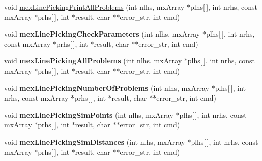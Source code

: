 \begin{DoxyCompactItemize}
\item 
void \hyperlink{group__matlabapi_gac6aa898603e0bfeff24f7eb02492641f}{mex\-Line\-Picking\-Print\-All\-Problems} (int nlhs, mx\-Array $\ast$plhs\mbox{[}$\,$\mbox{]}, int nrhs, const mx\-Array $\ast$prhs\mbox{[}$\,$\mbox{]}, int $\ast$result, char $\ast$$\ast$error\-\_\-str, int cmd)
\item 
\hypertarget{group__matlabapi_ga517627c493a1789dc8eeebdbeecd8a8d}{void {\bfseries mex\-Line\-Picking\-Check\-Parameters} (int nlhs, mx\-Array $\ast$plhs\mbox{[}$\,$\mbox{]}, int nrhs, const mx\-Array $\ast$prhs\mbox{[}$\,$\mbox{]}, int $\ast$result, char $\ast$$\ast$error\-\_\-str, int cmd)}\label{group__matlabapi_ga517627c493a1789dc8eeebdbeecd8a8d}

\item 
\hypertarget{group__matlabapi_ga9566788e47662982902e53d2b80e9cf4}{void {\bfseries mex\-Line\-Picking\-All\-Problems} (int nlhs, mx\-Array $\ast$plhs\mbox{[}$\,$\mbox{]}, int nrhs, const mx\-Array $\ast$prhs\mbox{[}$\,$\mbox{]}, int $\ast$result, char $\ast$$\ast$error\-\_\-str, int cmd)}\label{group__matlabapi_ga9566788e47662982902e53d2b80e9cf4}

\item 
\hypertarget{group__matlabapi_ga3049623df917340a56fa5df6278d06f6}{void {\bfseries mex\-Line\-Picking\-Number\-Of\-Problems} (int nlhs, mx\-Array $\ast$plhs\mbox{[}$\,$\mbox{]}, int nrhs, const mx\-Array $\ast$prhs\mbox{[}$\,$\mbox{]}, int $\ast$result, char $\ast$$\ast$error\-\_\-str, int cmd)}\label{group__matlabapi_ga3049623df917340a56fa5df6278d06f6}

\item 
\hypertarget{group__matlabapi_ga339fe5ed825457a410e325d1aac7c1e5}{void {\bfseries mex\-Line\-Picking\-Sim\-Points} (int nlhs, mx\-Array $\ast$plhs\mbox{[}$\,$\mbox{]}, int nrhs, const mx\-Array $\ast$prhs\mbox{[}$\,$\mbox{]}, int $\ast$result, char $\ast$$\ast$error\-\_\-str, int cmd)}\label{group__matlabapi_ga339fe5ed825457a410e325d1aac7c1e5}

\item 
\hypertarget{group__matlabapi_ga055cc9a6e9a046038ebc1d4fbe13cb74}{void {\bfseries mex\-Line\-Picking\-Sim\-Distances} (int nlhs, mx\-Array $\ast$plhs\mbox{[}$\,$\mbox{]}, int nrhs, const mx\-Array $\ast$prhs\mbox{[}$\,$\mbox{]}, int $\ast$result, char $\ast$$\ast$error\-\_\-str, int cmd)}\label{group__matlabapi_ga055cc9a6e9a046038ebc1d4fbe13cb74}

\end{DoxyCompactItemize}


